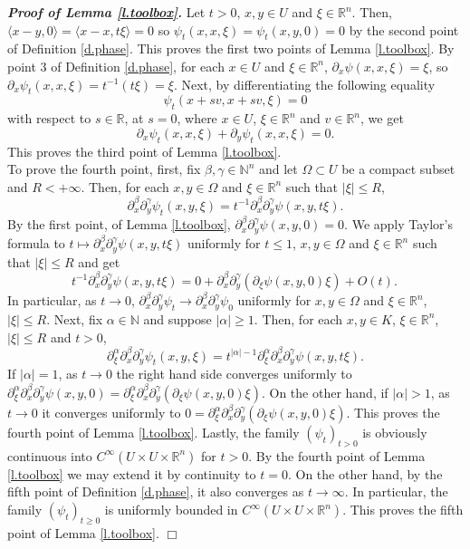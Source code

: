 \documentclass[10pt,twoside]{article}
\newcommand{\R}{\mathbb{R}}
\newcommand{\N}{\mathbb{N}}
\newenvironment{prf}[1][]
{\vskip 2mm  {\it \bf Proof#1. }}{$\Box$ \vskip 2mm}
\numberwithin{theorem}{section}
\begin{document}
\begin{prf}[ of Lemma \ref{l.toolbox}]
  Let $t>0$, $x,y\in U$ and $\xi\in\R^n$. Then, $\langle x-y,0\rangle = \langle x-x,t\xi\rangle =0$ so $\psi_t(x,x,\xi)=\psi_t(x,y,0)=0$ by the second point of Definition \ref{d.phase}. This proves the first two points of Lemma \ref{l.toolbox}. By point 3 of Definition \ref{d.phase}, for each $x\in U$ and $\xi\in\R^n$, $\partial_x\psi(x,x,\xi)=\xi$, so $\partial_x\psi_t(x,x,\xi)=t^{-1}(t\xi)=\xi$. Next, by differentiating the following equality
  \[\psi_t(x+sv,x+sv,\xi)=0\]
  with respect to $s\in\R$, at $s=0$, where $x\in U$, $\xi\in\R^n$ and $v\in\R^n$, we get
  \[\partial_x\psi_t(x,x,\xi)+\partial_y\psi_t(x,x,\xi)=0.\]
  This proves the third point of Lemma \ref{l.toolbox}.\\
To prove the fourth point, first, fix $\beta,\gamma\in\N^n$ and let $\Omega\subset U$ be a compact subset and $R<+\infty$. Then, for each $x,y\in\Omega$ and $\xi\in\R^n$ such that $|\xi|\leq R$,
  \[\partial^\beta_x\partial^\gamma_y\psi_t(x,y,\xi)=t^{-1}\partial^\beta_x\partial^\gamma_y\psi(x,y,t\xi).\]
  By the first point, of Lemma \ref{l.toolbox}, $\partial^\beta_x\partial^\gamma_y\psi(x,y,0)=0$. We apply Taylor's formula to $t\mapsto \partial^\beta_x\partial^\gamma_y\psi(x,y,t\xi)$ uniformly for $t\leq 1$, $x,y\in \Omega$ and $\xi\in\R^n$ such that $|\xi|\leq R$ and get
  \[t^{-1}\partial^\beta_x\partial^\gamma_y\psi(x,y,t\xi)=0+\partial^\beta_x\partial^\gamma_y(\partial_\xi\psi(x,y,0)\xi)+O(t).\,
  \]
  In particular, as $t\rightarrow 0$, $\partial^\beta_x\partial^\gamma_y\psi_t\rightarrow\partial^\beta_x\partial^\gamma_y\psi_0$ uniformly for $x,y\in \Omega$ and $\xi\in \R^n$, $|\xi|\leq R$. Next, fix $\alpha\in\N$ and suppose $|\alpha|\geq 1$. Then, for each $x,y\in K$, $\xi\in \R^n$, $|\xi|\leq R$ and $t>0$,
  \[\partial^\alpha_\xi\partial^\beta_x\partial^\gamma_y\psi_t(x,y,\xi)=t^{|\alpha|-1}\partial^\alpha_\xi\partial^\beta_x\partial^\gamma_y\psi(x,y,t\xi).\]
  If $|\alpha|=1$, as $t\rightarrow 0$ the right hand side converges uniformly to $\partial^\alpha_\xi\partial^\beta_x\partial^\gamma_y\psi(x,y,0)=\partial^\alpha_\xi\partial^\beta_x\partial^\gamma_y(\partial_\xi\psi(x,y,0)\xi)$. On the other hand, if $|\alpha|>1$, as $t\rightarrow 0$ it converges uniformly to $0=\partial^\alpha_\xi\partial^\beta_x\partial^\gamma_y(\partial_\xi\psi(x,y,0)\xi)$. This proves the fourth point of Lemma \ref{l.toolbox}. Lastly, the family $(\psi_t)_{t>0}$ is obviously continuous into $C^\infty(U\times U\times\R^n)$ for $t>0$. By the fourth point of Lemma \ref{l.toolbox} we may extend it by continuity to $t=0$. On the other hand, by the fifth point of Definition \ref{d.phase}, it also converges as $t\rightarrow\infty$. In particular, the family $(\psi_t)_{t\geq 0}$ is uniformly bounded in $C^\infty(U\times U\times\R^n)$. This proves the fifth point of Lemma \ref{l.toolbox}.
\end{prf}
\end{document}
